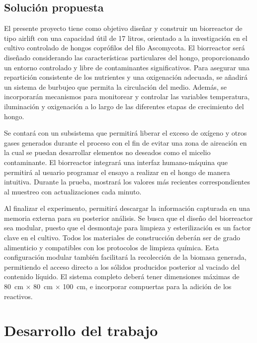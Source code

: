 \documentclass[11pt,tesis,twoside,openright,spanish]{upiiztt}
\begin{document}
\section{Solución propuesta}

El presente proyecto tiene como objetivo diseñar y construir un biorreactor de tipo
airlift con una capacidad útil de 17 litros, orientado a la investigación en el cultivo
controlado de hongos coprófilos del filo Ascomycota. El biorreactor será diseñado
considerando las características particulares del hongo, proporcionando un entorno
controlado y libre de contaminantes significativos. Para asegurar una repartición
consistente de los nutrientes y una oxigenación adecuada, se añadirá un sistema
de burbujeo que permita la circulación del medio. Además, se incorporarán
mecanismos para monitorear y controlar las variables temperatura, iluminación y
oxigenación a lo largo de las diferentes etapas de crecimiento del hongo.

Se contará con un subsistema que permitirá liberar el exceso de oxígeno y otros
gases generados durante el proceso con el fin de evitar una zona de aireación en
la cual se puedan desarrollar elementos no deseados como el micelio
contaminante. El biorreactor integrará una interfaz humano-máquina que permitirá
al usuario programar el ensayo a realizar en el hongo de manera intuitiva. Durante
la prueba, mostrará los valores más recientes correspondientes al muestreo con
actualizaciones cada minuto.

Al finalizar el experimento, permitirá descargar la información capturada en una
memoria externa para su posterior análisis. Se busca que el diseño del biorreactor
sea modular, puesto que el desmontaje para limpieza y esterilización es un factor
clave en el cultivo. Todos los materiales de construcción deberán ser de grado
alimenticio y compatibles con los protocolos de limpieza química. Esta
configuración modular también facilitará la recolección de la biomasa generada,
permitiendo el acceso directo a los sólidos producidos posterior al vaciado del
contenido líquido. El sistema completo deberá tener dimensiones máximas de
80~cm $\times$ 80~cm $\times$ 100~cm, e incorporar compuertas para la adición de los reactivos.

\chapter{Desarrollo del trabajo}\label{cap7}
\end{document}
